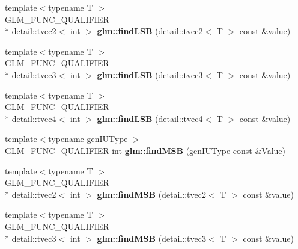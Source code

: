 \begin{DoxyCompactItemize}
\item 
\hypertarget{namespaceglm_ada2390329b6d8939a33c4c0483c1b51c}{{\footnotesize template$<$typename T $>$ }\\G\-L\-M\-\_\-\-F\-U\-N\-C\-\_\-\-Q\-U\-A\-L\-I\-F\-I\-E\-R \\*
detail\-::tvec2$<$ int $>$ {\bfseries glm\-::find\-L\-S\-B} (detail\-::tvec2$<$ T $>$ const \&value)}\label{namespaceglm_ada2390329b6d8939a33c4c0483c1b51c}

\item 
\hypertarget{namespaceglm_a9706c7ccb2061db6a078a742fb9ed7d0}{{\footnotesize template$<$typename T $>$ }\\G\-L\-M\-\_\-\-F\-U\-N\-C\-\_\-\-Q\-U\-A\-L\-I\-F\-I\-E\-R \\*
detail\-::tvec3$<$ int $>$ {\bfseries glm\-::find\-L\-S\-B} (detail\-::tvec3$<$ T $>$ const \&value)}\label{namespaceglm_a9706c7ccb2061db6a078a742fb9ed7d0}

\item 
\hypertarget{namespaceglm_affbe54a797335fd2dd46f5dbabb03f1e}{{\footnotesize template$<$typename T $>$ }\\G\-L\-M\-\_\-\-F\-U\-N\-C\-\_\-\-Q\-U\-A\-L\-I\-F\-I\-E\-R \\*
detail\-::tvec4$<$ int $>$ {\bfseries glm\-::find\-L\-S\-B} (detail\-::tvec4$<$ T $>$ const \&value)}\label{namespaceglm_affbe54a797335fd2dd46f5dbabb03f1e}

\item 
\hypertarget{namespaceglm_adc22c75c7dd35bacf86237d8bfe8b53a}{{\footnotesize template$<$typename gen\-I\-U\-Type $>$ }\\G\-L\-M\-\_\-\-F\-U\-N\-C\-\_\-\-Q\-U\-A\-L\-I\-F\-I\-E\-R int {\bfseries glm\-::find\-M\-S\-B} (gen\-I\-U\-Type const \&Value)}\label{namespaceglm_adc22c75c7dd35bacf86237d8bfe8b53a}

\item 
\hypertarget{namespaceglm_a242a34bcfa82ccbecb081091cfc5dcd3}{{\footnotesize template$<$typename T $>$ }\\G\-L\-M\-\_\-\-F\-U\-N\-C\-\_\-\-Q\-U\-A\-L\-I\-F\-I\-E\-R \\*
detail\-::tvec2$<$ int $>$ {\bfseries glm\-::find\-M\-S\-B} (detail\-::tvec2$<$ T $>$ const \&value)}\label{namespaceglm_a242a34bcfa82ccbecb081091cfc5dcd3}

\item 
\hypertarget{namespaceglm_a20b9f76c43fa5f5e8f2f735bf0ac05be}{{\footnotesize template$<$typename T $>$ }\\G\-L\-M\-\_\-\-F\-U\-N\-C\-\_\-\-Q\-U\-A\-L\-I\-F\-I\-E\-R \\*
detail\-::tvec3$<$ int $>$ {\bfseries glm\-::find\-M\-S\-B} (detail\-::tvec3$<$ T $>$ const \&value)}\label{namespaceglm_a20b9f76c43fa5f5e8f2f735bf0ac05be}


\end{DoxyCompactItemize}

